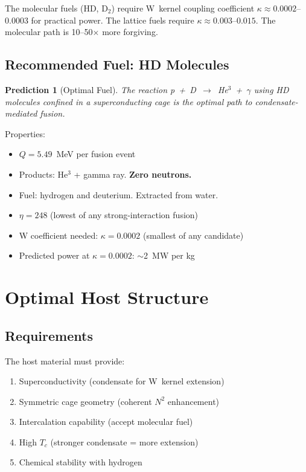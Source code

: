 \documentclass[11pt, a4paper]{article}
\newtheorem{prediction}{Prediction}[section]
\begin{document}
The molecular fuels (HD, D$_2$) require W~kernel coupling
coefficient $\kappa \approx 0.0002$--$0.0003$ for practical
power. The lattice fuels require $\kappa \approx 0.003$--$0.015$.
The molecular path is 10--50$\times$ more forgiving.

\subsection{Recommended Fuel: HD Molecules}

\begin{prediction}[Optimal Fuel]
The reaction p~+~D~$\to$~He$^3$~+~$\gamma$ using HD molecules
confined in a superconducting cage is the optimal path to
condensate-mediated fusion.
\end{prediction}

Properties:
\begin{itemize}[nosep]
  \item $Q = 5.49$~MeV per fusion event
  \item Products: He$^3$ + gamma ray. \textbf{Zero neutrons.}
  \item Fuel: hydrogen and deuterium. Extracted from water.
  \item $\eta = 248$ (lowest of any strong-interaction fusion)
  \item W coefficient needed: $\kappa = 0.0002$ (smallest of any
        candidate)
  \item Predicted power at $\kappa = 0.0002$: $\sim$2~MW per kg
\end{itemize}

\section{Optimal Host Structure}

\subsection{Requirements}

The host material must provide:
\begin{enumerate}[nosep]
  \item Superconductivity (condensate for W~kernel extension)
  \item Symmetric cage geometry (coherent $N^2$ enhancement)
  \item Intercalation capability (accept molecular fuel)
  \item High $T_c$ (stronger condensate = more extension)
  \item Chemical stability with hydrogen
\end{enumerate}
\end{document}
